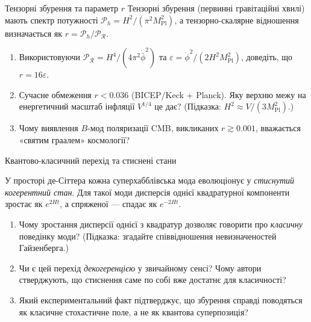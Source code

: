 \begin{problem}{Тензорні збурення та параметр $r$}
Тензорні збурення (первинні гравітаційні хвилі) мають спектр потужності
$\mathcal{P}_h = H^2/(\pi^2 M_{\mathrm{Pl}}^2)$, а тензорно-скалярне відношення
визначається як $r = \mathcal{P}_h / \mathcal{P}_{\mathcal{R}}$.

\begin{enumerate}
    \item Використовуючи $\mathcal{P}_{\mathcal{R}} = H^4/(4\pi^2\dot{\bar\phi}^2)$ та
          $\varepsilon = \dot{\phi}^2/(2H^2 M_{\mathrm{Pl}}^2)$, доведіть, що $r = 16\varepsilon$.
    \item Сучасне обмеження $r < 0.036$ (BICEP/Keck + Planck). Яку верхню межу
          на енергетичний масштаб інфляції $V^{1/4}$ це дає? (Підказка: $H^2 \approx V/(3M_{\mathrm{Pl}}^2)$.)
    \item Чому виявлення $B$-мод поляризації CMB, викликаних $r \gtrsim 0.001$,
          вважається «святим граалем» космології?
\end{enumerate}
\end{problem}


\begin{problem}{Квантово-класичний перехід та стиснені стани}

У просторі де-Сіттера кожна суперхабблівська мода еволюціонує у \emph{стиснутий
когерентний стан}. Для такої моди дисперсія однієї квадратурної компоненти
зростає як $e^{2Ht}$, а спряженої — спадає як $e^{-2Ht}$.

\begin{enumerate}
    \item Чому зростання дисперсії однієї з квадратур дозволяє говорити про
          \emph{класичну} поведінку моди? (Підказка: згадайте співвідношення
          невизначеностей Гайзенберга.)
    \item Чи є цей перехід \emph{декогеренцією} у звичайному сенсі? Чому автори
          \cite{polarski_starobinsky_1996} стверджують, що стиснення саме по собі
          вже достатнє для класичності?
    \item Який експериментальний факт підтверджує, що збурення справді поводяться
          як класичне стохастичне поле, а не як квантова суперпозиція?
\end{enumerate}
\end{problem}